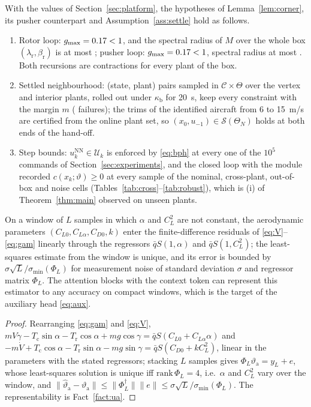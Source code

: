 \begin{proposition}\label{prop:num}
With the values of Section~\ref{sec:platform}, the hypotheses of Lemma~\ref{lem:corner}, its pusher counterpart and Assumption~\ref{ass:settle} hold as follows.
\begin{enumerate}[label=(\alph*),leftmargin=2em]
\item Rotor loop: $g_{\max}=0.17{}<1$, and the spectral radius of $M$ over the whole box $(\lambda_{\mathrm r},\beta_{\mathrm r})$ is at most \numKrRho{}; pusher loop: $g_{\max}=0.17{}<1$, spectral radius at most \numKcRho{}. Both recursions are contractions for every plant of the box.
\item Settled neighbourhood: \numSettlePairs{} (state, plant) pairs sampled in $\mathcal C\times\Theta$ over the \numPlantsFull{} vertex and interior plants, rolled out under $\kappa_{\mathrm b}$ for \SI{20}{s}, keep every constraint with the margin $m$ (\numSettleFail{} failures); the trims of the identified aircraft from \SI{6}{} to \SI{15}{m/s} are certified from the online plant set, so $(x_0,u_{-1})\in\mathcal S(\Theta_N)$ holds at both ends of the hand-off.
\item Step bounds: $u^{\mathrm{NN}}_k\in\mathcal U_k$ is enforced by \eqref{eq:bph} at every one of the $10^5$ commands of Section~\ref{sec:experiments}, and the closed loop with the module recorded $c(x_k;\vartheta)\ge0$ at every sample of the nominal, cross-plant, out-of-box and noise cells (Tables~\ref{tab:cross}--\ref{tab:robust}), which is (i) of Theorem~\ref{thm:main} observed on \numCross{} unseen plants.
\end{enumerate}
\end{proposition}

\begin{proposition}\label{prop:id}
On a window of $L$ samples in which $\alpha$ and $C_L^2$ are not constant, the aerodynamic parameters $(C_{L0},C_{L\alpha},C_{D0},k)$ enter the finite-difference residuals of \eqref{eq:V}--\eqref{eq:gam} linearly through the regressors $\bar qS(1,\alpha)$ and $\bar qS(1,C_L^2)$; the least-squares estimate from the window is unique, and its error is bounded by $\sigma\sqrt L/\sigma_{\min}(\Phi_L)$ for measurement noise of standard deviation $\sigma$ and regressor matrix $\Phi_L$. The attention blocks with the context token can represent this estimator to any accuracy on compact windows, which is the target of the auxiliary head \eqref{eq:aux}.
\end{proposition}
\begin{proof}
Rearranging \eqref{eq:gam} and \eqref{eq:V}, $mV\dot\gamma-T_{\mathrm c}\sin\alpha-T_{\mathrm r}\cos\alpha+mg\cos\gamma=\bar qS(C_{L0}+C_{L\alpha}\alpha)$ and $-m\dot V+T_{\mathrm c}\cos\alpha-T_{\mathrm r}\sin\alpha-mg\sin\gamma=\bar qS(C_{D0}+kC_L^2)$, linear in the parameters with the stated regressors; stacking $L$ samples gives $\Phi_L\vartheta_{\mathrm a}=y_L+e$, whose least-squares solution is unique iff $\mathrm{rank}\,\Phi_L=4$, i.e.\ $\alpha$ and $C_L^2$ vary over the window, and $\|\hat\vartheta_{\mathrm a}-\vartheta_{\mathrm a}\|\le\|\Phi_L^\dagger\|\|e\|\le\sigma\sqrt L/\sigma_{\min}(\Phi_L)$. The representability is Fact~\ref{fact:ua}.
\end{proof}
